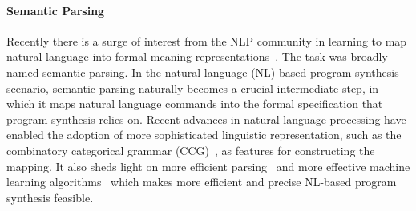 \paragraph{Semantic Parsing} 
Recently there is a surge of interest from the NLP community in learning to map natural language into formal meaning representations~\cite{Zettlemoyer05learningto,artzi2013weakly,DBLP:Poon13,Kwiatkowski:2011:LGC:2145432.2145593,liang2013learning}. The task was broadly named semantic parsing. In the natural language (NL)-based program synthesis scenario, semantic parsing naturally becomes a crucial intermediate step, in which it maps natural language commands into the formal specification that program synthesis relies on.  Recent advances in natural language processing have enabled the adoption of more sophisticated linguistic representation, such as the combinatory categorical grammar (CCG)~\cite{opac-b1080082}, as features for constructing the mapping. It also sheds light on more efficient parsing~\cite{lewis2015joint} and more effective machine learning algorithms~\cite{DBLP:journals/corr/ZarembaS14} which makes more efficient and precise NL-based program synthesis feasible.
